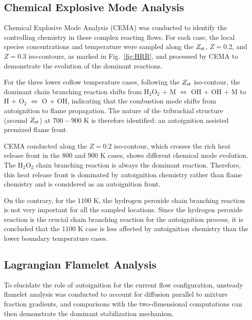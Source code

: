 \documentclass[twocolumn,10pt]{hphrc}
\begin{document}
\subsection*{Chemical Explosive Mode Analysis}

Chemical Explosive Mode Analysis (CEMA) was conducted to identify the controlling chemistry in these complex reacting flows.  For each case, the local species concentrations and temperature were sampled along the $Z_{\rm st}$, $Z = 0.2$, and $Z = 0.3$ iso-contours, as marked in Fig.~\ref{fig:HRR}, and processed by CEMA to demonstrate the evolution of the dominant reactions.  

For the three lower coflow temperature cases, following the $Z_{\rm st}$ iso-contour, the dominant chain branching reaction shifts from H$_2$O$_2$ + M $\Longleftrightarrow$ OH + OH + M to H + O$_2$ $\Longleftrightarrow$ O + OH, indicating that the combustion mode shifts from autoignition to flame propagation.  The nature of the tribrachial structure (around $Z_{\rm st}$) at $700-900$ K is therefore identified: an autoignition assisted premixed flame front.

CEMA conducted along the $Z = 0.2$ iso-contour, which crosses the rich heat release front in the $800$ and $900$ K cases, shows different chemical mode evolution. The H$_2$O$_2$ chain branching reaction is always the dominant reaction.  Therefore, this heat release front is dominated by autoignition chemistry rather than flame chemistry and is considered as an autoignition front.

On the contrary, for the $1100$ K, the hydrogen peroxide chain branching reaction is not very important for all the sampled locations.  Since the hydrogen peroxide reaction is the crucial chain branching reaction for the autoignition process, it is concluded that the $1100$ K case is less affected by autoignition chemistry than the lower boundary temperature cases.  

\subsection*{Lagrangian Flamelet Analysis}

To elucidate the role of autoignition for the current flow configuration, unsteady flamelet analysis was conducted to account for diffusion parallel to mixture fraction gradients, and comparisons with the two-dimensional computations can then demonstrate the dominant stabilization mechanism.
\end{document}
